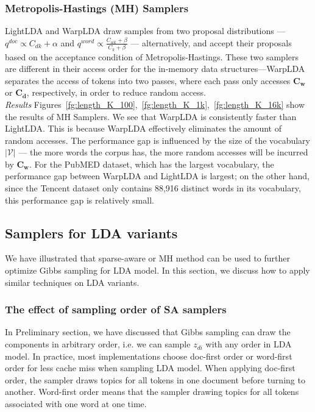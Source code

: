 \documentclass[10pt,journal,cspaper,compsoc]{IEEEtran}
\begin{document}
	\subsubsection{Metropolis-Hastings (MH) Samplers}
	
	LightLDA and WarpLDA draw samples from two
	proposal distributions --- $q^{doc} \propto C_{dk} + \alpha$
	and $q^{word} \propto \frac{C_{wk} + \beta}{C_k + \beta}$ --- alternatively, and accept their proposals based
	on the acceptance condition of Metropolis-Hastings.
	These two samplers are different in their access
	order for the in-memory data structures---WarpLDA
	separates the access of tokens into two passes,
	where each pass only accesses $\mathbf{C_w}$
	or $\mathbf{C_d}$, respectively, in order to
	reduce random access.
	\\

    \noindent
	{\large \em Results}
	Figures~\ref{fg:length_K_100},~\ref{fg:length_K_1k},~\ref{fg:length_K_16k} show the results of MH Samplers.
	We see that WarpLDA is consistently faster than
	LightLDA. This is because WarpLDA effectively
	eliminates the amount of random accesses.
	The performance gap is influenced by the
	size of the vocabulary $|\mathcal{V}|$ --- the more words
	the corpus has, the more random accesses will be incurred
	by $\mathbf{C_w}$.
	For the PubMED dataset, which has the largest vocabulary,
	the performance gap between WarpLDA and LightLDA is largest;
	on the other hand, since the Tencent dataset only contains 88,916 distinct words in its vocabulary, this
	performance gap is relatively small.
	
	\subsection{Samplers for LDA variants}
	We have illustrated that sparse-aware or MH method can be used
	to further optimize Gibbs sampling for LDA model. In this 
	section, we discuss how to apply similar techniques on 
	LDA variants.
	
	\subsubsection{The effect of sampling order of SA samplers}
	In Preliminary section, we have discussed that Gibbs 
	sampling can draw the components in arbitrary order, i.e.
	we can sample $z_{di}$ with any order in LDA model. In practice,
	most implementations choose doc-first order or word-first order for
	less cache miss when sampling LDA model. When applying 
	doc-first order, the sampler draws topics for all tokens in one document before turning to another. Word-first order means that
	the sampler drawing topics for all tokens associated with one word at one time.
	
\end{document}
